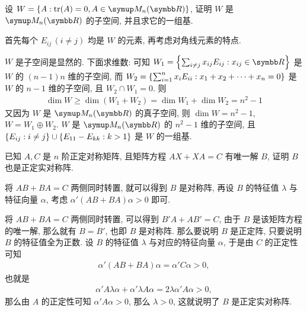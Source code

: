 \begin{exercise}[resume=exer]
        \item 设 $ W = \set{A : \tr(A) = 0, A \in \MM} $, 证明 $ W $ 是 $ \MM $ 的子空间, 并且求它的一组基.
        \begin{hint}
            首先每个 $ E_{ij}\,(i \ne j) $ 均是 $ W $ 的元素, 再考虑对角线元素的特点. 
        \end{hint}
        \begin{answer}
            $ W $ 是子空间是显然的. 下面求维数: 可知 $ W_{1} = \set{\sum_{i \ne j} x_{ij}E_{ij} : x_{ij} \in \R} $ 是 $ W $ 的 $ (n - 1)n $ 维的子空间, 而 $ W_{2} = \qty{\sum_{i = 1}^{n} x_{i}E_{ii} : x_{1} + x_{2} + \dots + x_{n} = 0} $ 是 $ W  $ 的 $ n - 1 $ 维的子空间, 且 $ W_{2} \cap W_{1} = 0 $. 则
            \begin{align*}
                \dim W \ge \dim(W_{1} + W_{2}) = \dim W_{1} + \dim W_{2} = n^{2} - 1
            \end{align*}
            又因为 $ W $ 是 $ \MM $ 的真子空间, 则 $ \dim W = n^{2} - 1 $, $ W = W_{1} \oplus W_{2} $. 
            $ W $ 是 $ \MM $ 的 $ n^{2} - 1 $ 维的子空间, 且 $ \qty{E_{ij} : i \ne j} \cup \qty{E_{11} - E_{kk} : k > 1} $ 是 $ W $ 的一组基.
        \end{answer}
        \item 已知 $ A, C $ 是 $ n $ 阶正定对称矩阵, 且矩阵方程 $ AX + XA = C $ 有唯一解 $ B $, 证明 $ B $ 也是正定实对称阵. 
        \begin{hint}
            将 $ AB + BA = C $ 两侧同时转置, 就可以得到 $ B $ 是对称阵, 再设 $ B $ 的特征值 $ \lambda $ 与特征向量 $ \alpha $, 考虑 $ \alpha'(AB + BA)\alpha > 0 $ 即可.
        \end{hint}
        \begin{answer}
            将 $ AB + BA = C $ 两侧同时转置, 可以得到 $ B'A + AB' = C $, 由于 $ B $ 是该矩阵方程的唯一解, 那么就有 $ B = B' $, 也即 $ B $ 是对称阵. 那么要说明 $ B $ 是正定阵, 只要说明 $ B $ 的特征值全为正数. 设 $ B $ 的特征值 $ \lambda $ 与对应的特征向量 $ \alpha $, 于是由 $ C $ 的正定性可知
            \begin{align*}
                \alpha'(AB + BA)\alpha = \alpha'C\alpha > 0,
            \end{align*}
            也就是
            \begin{align*}
                \alpha'A\lambda\alpha + \alpha'\lambda A\alpha = 2\lambda\alpha' A\alpha > 0,
            \end{align*}
            那么由 $ A $ 的正定性可知 $ \alpha' A\alpha > 0 $, 那么 $ \lambda > 0 $, 这就说明了 $ B $ 是正定实对称阵. 

\end{answer}
\end{exercise}
